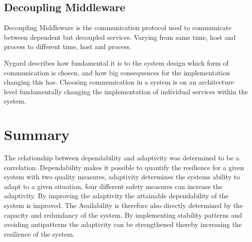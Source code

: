 \subsection{Decoupling Middleware}
Decoupling Middleware is the communication protocol used to communicate between dependent but decoupled services. Varying from same time, host and process to different time, host and process.

Nygard describes how fundamental it is to the system design which form of communication is chosen, and how big consequences for the implementation changing this has. Choosing communication in a system is on an architecture level fundamentally changing the implementation of individual services within the system.

\section{Summary}
The relationship between dependability and adaptivity was determined to be a correlation. Dependability makes it possible to quantify the resilience for a given system with two quality measures, adaptivity determines the systems ability to adapt to a given situation, four different safety measures can increase the adaptivity. By improving the adaptivity the attainable dependability of the system is improved. The Availability is therefore also directly determined by the capacity and redundancy of the system. By implementing stability patterns and avoiding antipatterns the adaptivity can be strengthened thereby increasing the resilience of the system.